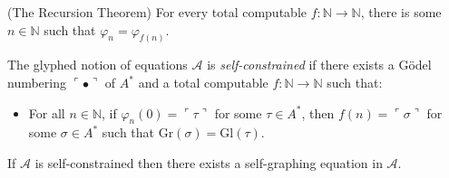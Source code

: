 \documentclass[10pt,a4paper]{amsart}
\begin{document}
\begin{theorem}
\label{recursionthm}
  (The Recursion Theorem)
  For every total computable $f:\mathbb N\to\mathbb N$, there is some
  $n\in\mathbb N$ such that $\varphi_n=\varphi_{f(n)}$.
\end{theorem}

\begin{definition}
\label{selfconstraintdefn}
  The glyphed notion of equations $\mathcal A$ is \emph{self-constrained}
  if there exists a G\"odel numbering $\ulcorner\bullet\urcorner$
  of $A^*$ and a total computable $f:\mathbb N\to\mathbb N$ such that:
  \begin{itemize}
    \item
    For all $n\in\mathbb N$, if $\varphi_n(0)=\ulcorner\tau\urcorner$
    for some $\tau\in A^*$, then
    $f(n)=\ulcorner\sigma\urcorner$ for some $\sigma\in A^*$
    such that $\mathrm{Gr}(\sigma)=\mathrm{Gl}(\tau)$.
  \end{itemize}
\end{definition}

\begin{theorem}
\label{maintheorem}
  If $\mathcal A$ is self-constrained then there exists a self-graphing
  equation in $\mathcal A$.
\end{theorem}
\end{document}
